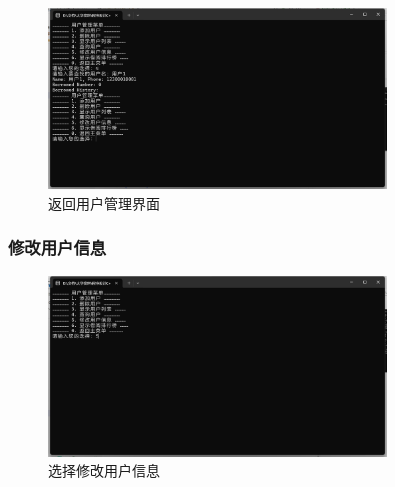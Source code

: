 \documentclass[12pt,twoside]{ctexart}
\begin{document}
\begin{figure}[H]
    \centering
    \includegraphics[width=0.8\textwidth]{searchresult.png}
    \caption{返回用户管理界面}
    \label{fig:searchresult}
\end{figure}

\subsubsection{修改用户信息}

\begin{figure}[H]
    \centering
    \includegraphics[width=0.8\textwidth]{selectchangeuser.png}
    \caption{选择修改用户信息}
\end{figure}
\end{document}
